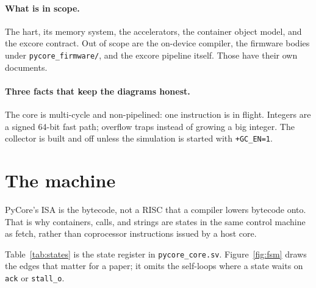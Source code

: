 \documentclass[11pt,a4paper]{article}
\begin{document}
\paragraph{What is in scope.}
The hart, its memory system, the accelerators, the container object model,
and the excore contract.
Out of scope are the on-device compiler, the firmware bodies under
\texttt{pycore\_firmware/}, and the excore pipeline itself.
Those have their own documents.

\paragraph{Three facts that keep the diagrams honest.}
The core is multi-cycle and non-pipelined: one instruction is in flight.
Integers are a signed 64-bit fast path; overflow traps instead of growing a
big integer.
The collector is built and off unless the simulation is started with
\texttt{+GC\_EN=1}.

\section{The machine}
\label{sec:machine}



PyCore's ISA is the bytecode, not a RISC that a compiler lowers bytecode onto.
That is why containers, calls, and strings are states in the same control
machine as fetch, rather than coprocessor instructions issued by a host core.

Table~\ref{tab:states} is the state register in \texttt{pycore\_core.sv}.
Figure~\ref{fig:fsm} draws the edges that matter for a paper; it omits the
self-loops where a state waits on \texttt{ack} or \texttt{stall\_o}.
\end{document}
